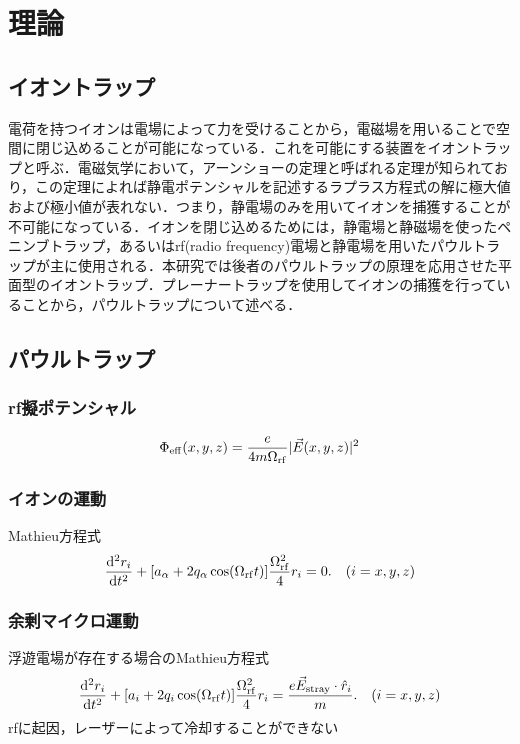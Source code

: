\section{理論}
\subsection{イオントラップ}
電荷を持つイオンは電場によって力を受けることから，電磁場を用いることで空間に閉じ込めることが可能になっている．これを可能にする装置をイオントラップと呼ぶ．電磁気学において，アーンショーの定理と呼ばれる定理が知られており，この定理によれば静電ポテンシャルを記述するラプラス方程式の解に極大値および極小値が表れない．つまり，静電場のみを用いてイオンを捕獲することが不可能になっている．イオンを閉じ込めるためには，静電場と静磁場を使ったペニンブトラップ，あるいはrf(radio frequency)電場と静電場を用いたパウルトラップが主に使用される．本研究では後者のパウルトラップの原理を応用させた平面型のイオントラップ．プレーナートラップを使用してイオンの捕獲を行っていることから，パウルトラップについて述べる．
\subsection{パウルトラップ}
\subsubsection{rf擬ポテンシャル}
\large
\begin{align}
	\Phi_{\rm eff}(x,y,z) = \frac{e}{4m\Omega_{\rm rf}}|\vec{E}(x,y,z)|^2
\end{align}
\normalsize


\subsubsection{イオンの運動}
Mathieu方程式
\large
\begin{align}
	\frac{{\rm d^2}r_i}{{\rm d}t^2} + [a_\alpha + 2q_\alpha \cos (\Omega_{\rm rf} t)]\frac{\Omega_{\rm rf}^2}{4}r_i = 0. \quad (i = x,y,z)
\end{align}
\normalsize
\subsubsection{余剰マイクロ運動}
浮遊電場が存在する場合のMathieu方程式
\large
\begin{align}
	\frac{{\rm d^2}r_i}{{\rm d}t^2} + [a_i + 2q_i \cos (\Omega_{\rm rf} t)]\frac{\Omega_{\rm rf}^2}{4}r_i = \frac{e\vec{E}_{\rm stray}\cdot \hat{r}_i}{m}. \quad (i = x,y,z)
\end{align}
\normalsize
rfに起因，レーザーによって冷却することができない
\clearpage
